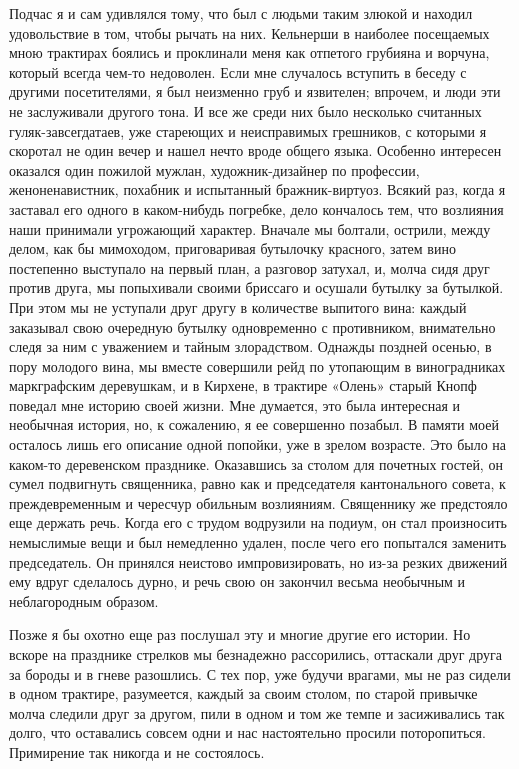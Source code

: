 Подчас  я  и  сам  удивлялся  тому, что  был  с  людьми  таким  злюкой
и  находил  удовольствие в  том,  чтобы  рычать  на них.  Кельнерши  в
наиболее  посещаемых  мною трактирах  боялись  и  проклинали меня  как
отпетого грубияна и ворчуна, который всегда чем-то недоволен. Если мне
случалось вступить  в беседу с  другими посетителями, я  был неизменно
груб и язвителен;  впрочем, и люди эти не заслуживали  другого тона. И
все  же среди  них  было несколько  считанных гуляк-завсегдатаев,  уже
стареющих  и неисправимых  грешников, с  которыми я  скоротал не  один
вечер и  нашел нечто вроде  общего языка. Особенно  интересен оказался
один пожилой мужлан,  художник-дизайнер по профессии, женоненавистник,
похабник и  испытанный бражник-виртуоз.  Всякий раз, когда  я заставал
его одного в каком-нибудь погребке,  дело кончалось тем, что возлияния
наши принимали угрожающий характер. Вначале мы болтали, острили, между
делом,  как  бы  мимоходом,  приговаривая  бутылочку  красного,  затем
вино  постепенно выступало  на  первый план,  а  разговор затухал,  и,
молча  сидя  друг  против  друга,  мы  попыхивали  своими  бриссаго  и
осушали бутылку  за бутылкой.  При этом  мы не  уступали друг  другу в
количестве  выпитого вина:  каждый  заказывал  свою очередную  бутылку
одновременно с  противником, внимательно  следя за  ним с  уважением и
тайным злорадством. Однажды  поздней осенью, в пору  молодого вина, мы
вместе  совершили  рейд  по  утопающим  в  виноградниках  маркграфским
деревушкам, и в  Кирхене, в трактире «Олень» старый  Кнопф поведал мне
историю своей  жизни. Мне  думается, это  была интересная  и необычная
история,  но, к  сожалению, я  ее  совершенно позабыл.  В памяти  моей
осталось  лишь его  описание  одной попойки,  уже  в зрелом  возрасте.
Это  было  на каком-то  деревенском  празднике.  Оказавшись за  столом
для  почетных  гостей,  он  сумел  подвигнуть  священника,  равно  как
и  председателя кантонального  совета,  к  преждевременным и  чересчур
обильным возлияниям. Священнику же  предстояло еще держать речь. Когда
его  с трудом  водрузили  на подиум,  он  стал произносить  немыслимые
вещи  и  был немедленно  удален,  после  чего его  попытался  заменить
председатель. Он  принялся неистово  импровизировать, но  из-за резких
движений ему  вдруг сделалось  дурно, и речь  свою он  закончил весьма
необычным и неблагородным образом.

Позже я бы охотно еще раз послушал эту и многие другие его истории. Но
вскоре на празднике стрелков мы безнадежно рассорились, оттаскали друг
друга за бороды и в гневе разошлись. С тех пор, уже будучи врагами, мы
не раз сидели в одном трактире, разумеется, каждый за своим столом, по
старой  привычке молча  следили друг  за другом,  пили в  одном и  том
же  темпе и  засиживались  так  долго, что  оставались  совсем одни  и
нас  настоятельно просили  поторопиться. Примирение  так никогда  и не
состоялось.


